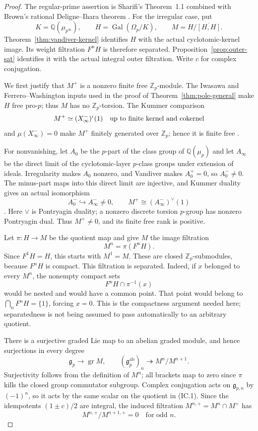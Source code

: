 \documentclass[11pt,a4paper]{article}
\theoremstyle{definition}
\begin{document}
\begin{proof}
The regular-prime assertion is Sharifi's Theorem~1.1 combined with
Brown's rational Deligne--Ihara theorem
\cite[Theorem~1.1, p.~2]{Sharifi2002}\cite[\S\S2.1--2.3]{Brown2019}.
For the irregular case, put
\[
 K=\mathbb Q(\mu_{p^\infty}),\qquad
 H=\operatorname{Gal}(\Omega_p/K),\qquad
 M=H/\overline{[H,H]}.
\]
Theorem~\ref{thm:vandiver-kernel} identifies $H$ with the actual
cyclotomic-kernel image.  Its weight filtration $F^nH$ is therefore
separated.  Proposition~\ref{prop:outer-sat} identifies it with the
actual integral outer filtration.  Write $c$ for complex conjugation.

We first justify that $M^+$ is a nonzero finite free
$\mathbb Z_p$-module.  The Iwasawa and Ferrero--Washington inputs used
in the proof of Theorem~\ref{thm:pole-general} make $H$ free pro-$p$;
thus $M$ has no $\mathbb Z_p$-torsion.  The Kummer comparison
\[
 M^+\simeq (X_\infty^-)^\iota(1)
 \quad\hbox{up to finite kernel and cokernel}
\]
and $\mu(X_\infty^-)=0$ make $M^+$ finitely generated over
$\mathbb Z_p$; hence it is finite free
\cite[Theorem~2]{Iwasawa1981}
\cite[Proposition~3.4.7 and Corollary~3.4.8]{SharifiIwasawaNotes}.

For nonvanishing, let $A_0$ be the $p$-part of the class group of
$\mathbb Q(\mu_p)$ and let $A_\infty$ be the direct limit of the
cyclotomic-layer $p$-class groups under extension of ideals.
Irregularity makes $A_0$ nonzero, and Vandiver makes $A_0^+=0$,
so $A_0^-\ne0$.  The minus-part maps into this direct limit are
injective, and Kummer duality gives an actual isomorphism
\[
 A_0^-\hookrightarrow A_\infty^-\ne0,
 \qquad M^+\cong(A_\infty^-)^\vee(1)
\]
\cite[Propositions~3.4.1 and~3.4.7]{SharifiIwasawaNotes}.
Here $\vee$ is Pontryagin duality; a nonzero discrete torsion
$p$-group has nonzero Pontryagin dual.  Thus $M^+\ne0$, and its
finite free rank is positive.

Let $\pi:H\to M$ be the quotient map and give $M$ the image
filtration
\[
 M^n=\pi(F^nH).
\]
Since $F^1H=H$, this starts with $M^1=M$.
These are closed $\mathbb Z_p$-submodules, because $F^nH$ is
compact.  This filtration is separated.  Indeed, if $x$ belonged
to every $M^n$, the nonempty compact sets
\[
 F^nH\cap\pi^{-1}(x)
\]
would be nested and would have a common point.  That point would
belong to $\bigcap_nF^nH=\{1\}$, forcing $x=0$.
This is the compactness argument needed here; separatedness is
not being assumed to pass automatically to an arbitrary quotient.

There is a surjective graded Lie map to an abelian graded module,
and hence surjections in every degree
\[
 \mathfrak g_p\longrightarrow\operatorname{gr}M,
 \qquad
 (\mathfrak g_p^{\mathrm{ab}})_n
       \twoheadrightarrow M^n/M^{n+1}.                       \tag{IC.1}
\]
Surjectivity follows from the definition of $M^n$; all brackets
map to zero since $\pi$ kills the closed group commutator subgroup.
Complex conjugation acts on $\mathfrak g_{p,n}$ by $(-1)^n$,
so it acts by the same scalar on the quotient in (IC.1).
Since the idempotents $(1\pm c)/2$ are integral, the induced
filtration $M^{n,+}=M^n\cap M^+$ has
\[
 M^{n,+}/M^{n+1,+}=0\quad\text{for odd }n.                   \tag{IC.2}
\]


\end{proof}
\end{document}
